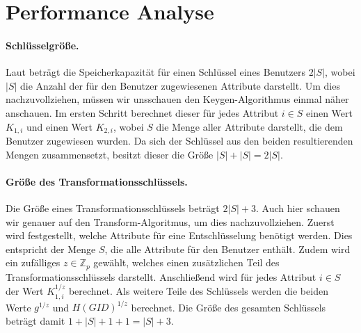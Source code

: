 \newcommand{\sizeof}[1]{\small\texttt{size}\left( #1 \right)}
\renewcommand{\O}[1]{\mathcal{O} \left( #1 \right)}

\newpage
\section{Performance Analyse}
\paragraph{Schlüsselgröße.}
Laut \cite{phoabe} beträgt die Speicherkapazität für einen Schlüssel eines
Benutzers $2 \lvert S \rvert$, wobei $\lvert S \rvert$ die Anzahl der für
den Benutzer zugewiesenen Attribute darstellt. Um dies nachzuvollziehen, müssen
wir unsschauen den Keygen-Algorithmus einmal näher anschauen. Im ersten Schritt
berechnet dieser für jedes Attribut $i \in S$ einen Wert $K_{1,i}$ und einen Wert
$K_{2,i}$, wobei $S$ die Menge aller Attribute darstellt, die dem Benutzer
zugewiesen wurden. Da sich der Schlüssel aus den beiden resultierenden Mengen
zusammensetzt, besitzt dieser die Größe $\lvert S \rvert + \lvert S \rvert = 2
\lvert S \rvert$.

\paragraph{Größe des Transformationsschlüssels.}
Die Größe eines Transformationsschlüssels beträgt $2 \lvert S \rvert + 3$. Auch
hier schauen wir genauer auf den Transform-Algoritmus, um dies nachzuvollziehen.
Zuerst wird festgestellt, welche Attribute für eine Entschlüsselung benötigt
werden. Dies entspricht der Menge $S$, die alle Attribute für den Benutzer
enthält. Zudem wird ein zufälliges $z \in \mathbb{Z}_p$ gewählt, welches
einen zusätzlichen Teil des Transformationsschlüssels darstellt. Anschließend
wird für jedes Attribut $i \in S$ der Wert $K_{1,i}^{1/z}$ berechnet. Als
weitere Teile des Schlüssels werden die beiden Werte $g^{1/z}$ und
$H(GID)^{1/z}$ berechnet. Die Größe des gesamten Schlüssels beträgt damit $1 +
\lvert S \rvert + 1 + 1 = \lvert S \rvert + 3$.

